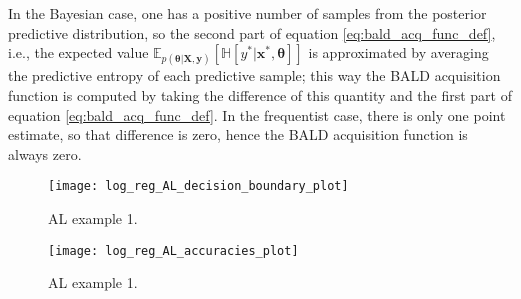 In the Bayesian case, one has a positive number of samples from the posterior predictive distribution, so the second part of equation \eqref{eq:bald_acq_func_def}, i.e., the expected value
$\mathbb{E}_{p(\boldsymbol{\theta} | \boldsymbol{X}, \boldsymbol{y})} \left[ \mathbb{H} \left[ y^* | \boldsymbol{x}^*, \boldsymbol{\theta} \right] \right]$
is approximated by averaging the predictive entropy of each predictive sample; this way the BALD acquisition function is computed by taking the difference of this quantity and the first part of equation \eqref{eq:bald_acq_func_def}.
In the frequentist case, there is only one point estimate, so that difference is zero, hence the BALD acquisition function is always zero.

\begin{figure}[H]
    \centering
    \texttt{[image: log\_reg\_AL\_decision\_boundary\_plot]}
    \caption{AL example 1.}
    \label{fig:log_reg_AL_decision_boundary_plot}
\end{figure}



\begin{figure}[H]
    \centering
    \texttt{[image: log\_reg\_AL\_accuracies\_plot]}
    \caption{AL example 1.}
    \label{fig:log_reg_AL_accuracies_plot}
\end{figure}
